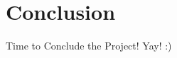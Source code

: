 \documentclass[../main.tex]{subfiles}
\begin{document}
\section{Conclusion}
Time to Conclude the Project! Yay! :)
\end{document}
